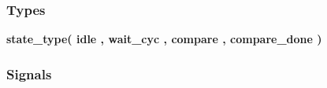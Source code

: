 \subsubsection*{Types}
 \begin{DoxyCompactItemize}
\item 
{\bfseries {\bf state\+\_\+type}{\bfseries \textcolor{vhdlchar}{(}\textcolor{vhdlchar}{ }\textcolor{vhdlchar}{idle}\textcolor{vhdlchar}{ }\textcolor{vhdlchar}{,}\textcolor{vhdlchar}{ }\textcolor{vhdlchar}{wait\+\_\+cyc}\textcolor{vhdlchar}{ }\textcolor{vhdlchar}{,}\textcolor{vhdlchar}{ }\textcolor{vhdlchar}{compare}\textcolor{vhdlchar}{ }\textcolor{vhdlchar}{,}\textcolor{vhdlchar}{ }\textcolor{vhdlchar}{compare\+\_\+done}\textcolor{vhdlchar}{ }\textcolor{vhdlchar}{)}\textcolor{vhdlchar}{ }}} 
\end{DoxyCompactItemize}
\subsubsection*{Signals}
